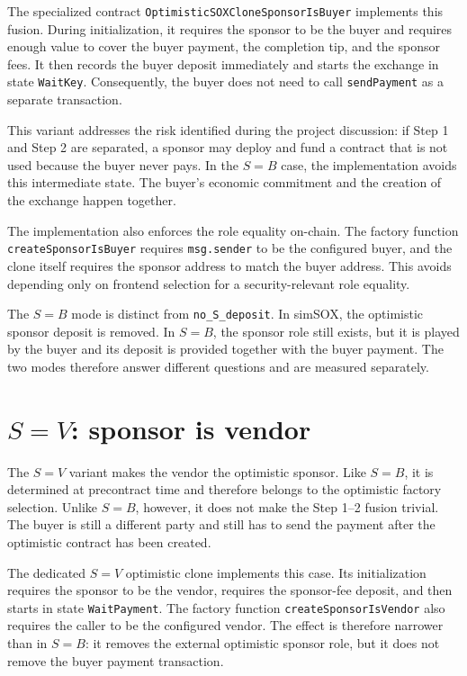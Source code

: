 The specialized contract \texttt{OptimisticSOXCloneSponsorIsBuyer} implements this fusion.
During initialization, it requires the sponsor to be the buyer and requires enough value to
cover the buyer payment, the completion tip, and the sponsor fees. It then records the buyer
deposit immediately and starts the exchange in state \texttt{WaitKey}. Consequently, the
buyer does not need to call \texttt{sendPayment} as a separate transaction.

This variant addresses the risk identified during the project discussion: if Step 1 and
Step 2 are separated, a sponsor may deploy and fund a contract that is not used because the
buyer never pays. In the \(S=B\) case, the implementation avoids this intermediate state.
The buyer's economic commitment and the creation of the exchange happen together.

The implementation also enforces the role equality on-chain. The factory function
\texttt{createSponsorIsBuyer} requires \texttt{msg.sender} to be the configured buyer, and
the clone itself requires the sponsor address to match the buyer address. This avoids
depending only on frontend selection for a security-relevant role equality.

The \(S=B\) mode is distinct from \texttt{no\_S\_deposit}. In simSOX, the optimistic sponsor
deposit is removed. In \(S=B\), the sponsor role still exists, but it is played by the buyer
and its deposit is provided together with the buyer payment. The two modes therefore answer
different questions and are measured separately.

\section[S=V: sponsor is vendor]{\(S=V\): sponsor is vendor}

The \(S=V\) variant makes the vendor the optimistic sponsor. Like \(S=B\), it is determined
at precontract time and therefore belongs to the optimistic factory selection. Unlike
\(S=B\), however, it does not make the Step 1--2 fusion trivial. The buyer is still a
different party and still has to send the payment after the optimistic contract has been
created.

The dedicated \(S=V\) optimistic clone implements this case. Its initialization requires the
sponsor to be the vendor, requires the sponsor-fee deposit, and then starts in state
\texttt{WaitPayment}. The factory function \texttt{createSponsorIsVendor} also requires the
caller to be the configured vendor. The effect is therefore narrower than in \(S=B\): it
removes the external optimistic sponsor role, but it does not remove the buyer payment
transaction.

